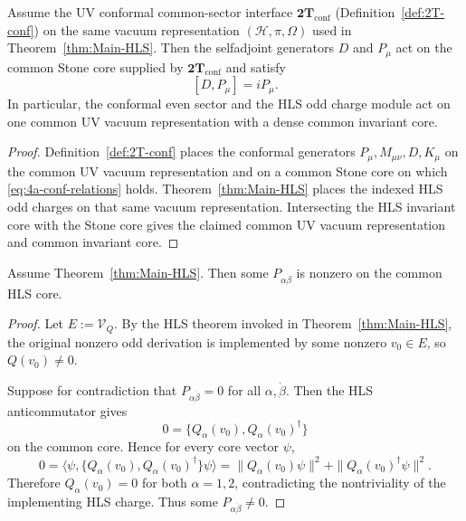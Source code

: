 \begin{lemma}
\label{thm:4a-uv-dilatation-ebc}
Assume the UV conformal common-sector interface
\(\mathbf{2T}_{\mathrm{conf}}\)
\textnormal{(Definition~\ref{def:2T-conf})} on the same vacuum representation
\((\mathcal H,\pi,\Omega)\) used in Theorem~\ref{thm:Main-HLS}. Then the
selfadjoint generators \(D\) and \(P_\mu\) act on the common Stone core supplied
by \(\mathbf{2T}_{\mathrm{conf}}\) and satisfy
\begin{equation}
\label{eq:4a-conf-relations}
  [D,P_\mu] = i P_\mu.
\end{equation}
In particular, the conformal even sector and the HLS odd charge module act on
one common UV vacuum representation with a dense common invariant core.
\end{lemma}

\begin{proof}
Definition~\ref{def:2T-conf} places the conformal generators
\(P_\mu,M_{\mu\nu},D,K_\mu\) on the common UV vacuum representation and on a
common Stone core on which \eqref{eq:4a-conf-relations} holds.
Theorem~\ref{thm:Main-HLS} places the indexed HLS odd charges on that same vacuum
representation. Intersecting the HLS invariant core with the Stone core gives the
claimed common UV vacuum representation and common invariant core.
\end{proof}

\begin{lemma}
\label{lem:4a-HLS-nonzero-translation}
Assume Theorem~\ref{thm:Main-HLS}. Then some
\(P_{\alpha\dot\beta}\) is nonzero on the common HLS core.
\end{lemma}

\begin{proof}
Let \(E:=\mathcal V_Q\). By the HLS theorem invoked in
Theorem~\ref{thm:Main-HLS}, the original nonzero odd derivation is implemented by
some nonzero \(v_0\in E\), so \(Q(v_0)\neq 0\).

Suppose for contradiction that \(P_{\alpha\dot\beta}=0\) for all
\(\alpha,\dot\beta\). Then the HLS anticommutator gives
\[
0
=
\{Q_\alpha(v_0),Q_\alpha(v_0)^\dagger\}
\]
on the common core. Hence for every core vector \(\psi\),
\[
0
=
\langle \psi,\{Q_\alpha(v_0),Q_\alpha(v_0)^\dagger\}\psi\rangle
=
\|Q_\alpha(v_0)\psi\|^2+\|Q_\alpha(v_0)^\dagger\psi\|^2.
\]
Therefore \(Q_\alpha(v_0)=0\) for both \(\alpha=1,2\), contradicting the
nontriviality of the implementing HLS charge. Thus some
\(P_{\alpha\dot\beta}\neq 0\).
\end{proof}

